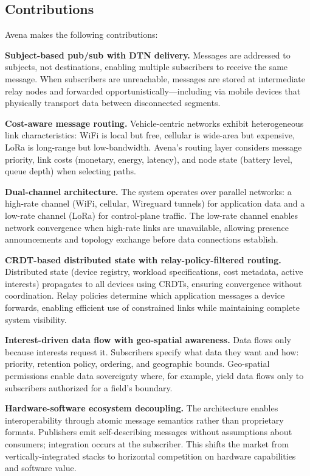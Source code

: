 \documentclass[journal]{IEEEtran}
\begin{document}
\subsection{Contributions}

Avena makes the following contributions:

\textbf{Subject-based pub/sub with DTN delivery.} Messages are addressed to subjects, not destinations, enabling multiple subscribers to receive the same message. When subscribers are unreachable, messages are stored at intermediate relay nodes and forwarded opportunistically---including via mobile devices that physically transport data between disconnected segments.

\textbf{Cost-aware message routing.} Vehicle-centric networks exhibit heterogeneous link characteristics: WiFi is local but free, cellular is wide-area but expensive, LoRa is long-range but low-bandwidth. Avena's routing layer considers message priority, link costs (monetary, energy, latency), and node state (battery level, queue depth) when selecting paths.

\textbf{Dual-channel architecture.} The system operates over parallel networks: a high-rate channel (WiFi, cellular, Wireguard tunnels) for application data and a low-rate channel (LoRa) for control-plane traffic. The low-rate channel enables network convergence when high-rate links are unavailable, allowing presence announcements and topology exchange before data connections establish.

\textbf{CRDT-based distributed state with relay-policy-filtered routing.} Distributed state (device registry, workload specifications, cost metadata, active interests) propagates to all devices using CRDTs, ensuring convergence without coordination. Relay policies determine which application messages a device forwards, enabling efficient use of constrained links while maintaining complete system visibility.

\textbf{Interest-driven data flow with geo-spatial awareness.} Data flows only because interests request it. Subscribers specify what data they want and how: priority, retention policy, ordering, and geographic bounds. Geo-spatial permissions enable data sovereignty where, for example, yield data flows only to subscribers authorized for a field's boundary.

\textbf{Hardware-software ecosystem decoupling.} The architecture enables interoperability through atomic message semantics rather than proprietary formats. Publishers emit self-describing messages without assumptions about consumers; integration occurs at the subscriber. This shifts the market from vertically-integrated stacks to horizontal competition on hardware capabilities and software value.
\end{document}
